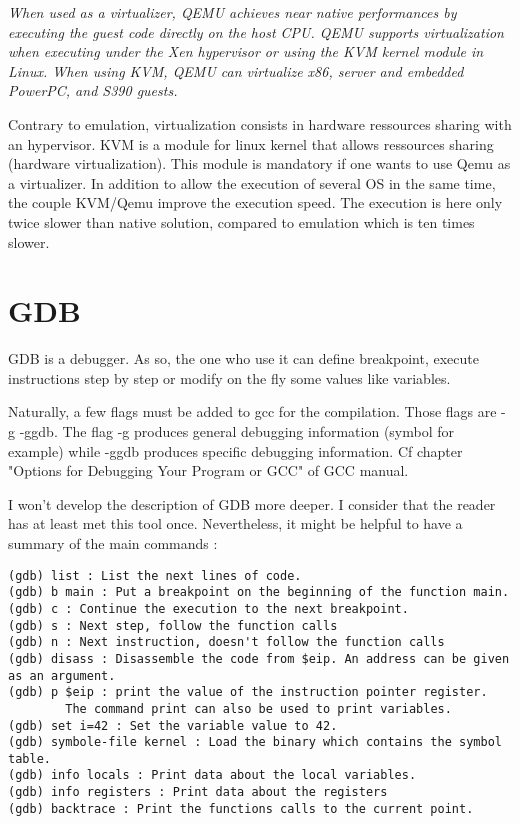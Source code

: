 \textit{When used as a virtualizer, QEMU achieves near native performances by executing the guest code directly on the host CPU. QEMU supports virtualization when executing under the Xen hypervisor or using the KVM kernel module in Linux. When using KVM, QEMU can virtualize x86, server and embedded PowerPC, and S390 guests.}

Contrary to emulation, virtualization consists in hardware ressources sharing with an hypervisor. KVM is a module for linux kernel that allows ressources sharing (hardware virtualization). This module is mandatory if one wants to use Qemu as a virtualizer. In addition to allow the execution of several OS in the same time, the couple KVM/Qemu improve the execution speed. The execution is here only twice slower than native solution, compared to emulation which is ten times slower.

\section{GDB}
GDB is a debugger. As so, the one who use it can define breakpoint, execute instructions step by step or modify on the fly some values like variables.

Naturally, a few flags must be added to gcc for the compilation. Those flags are -g -ggdb. The flag -g produces general debugging information (symbol for example) while -ggdb produces specific debugging information. Cf chapter "Options for Debugging Your Program or GCC" of GCC manual.

I won't develop the description of GDB more deeper. I consider that the reader has at least met this tool once. Nevertheless, it might be helpful to have a summary of the main commands :

\begin{verbatim}
(gdb) list : List the next lines of code.
(gdb) b main : Put a breakpoint on the beginning of the function main.
(gdb) c : Continue the execution to the next breakpoint.
(gdb) s : Next step, follow the function calls
(gdb) n : Next instruction, doesn't follow the function calls
(gdb) disass : Disassemble the code from $eip. An address can be given as an argument.
(gdb) p $eip : print the value of the instruction pointer register.
		The command print can also be used to print variables.
(gdb) set i=42 : Set the variable value to 42.
(gdb) symbole-file kernel : Load the binary which contains the symbol table.
(gdb) info locals : Print data about the local variables.
(gdb) info registers : Print data about the registers
(gdb) backtrace : Print the functions calls to the current point.
\end{verbatim}

